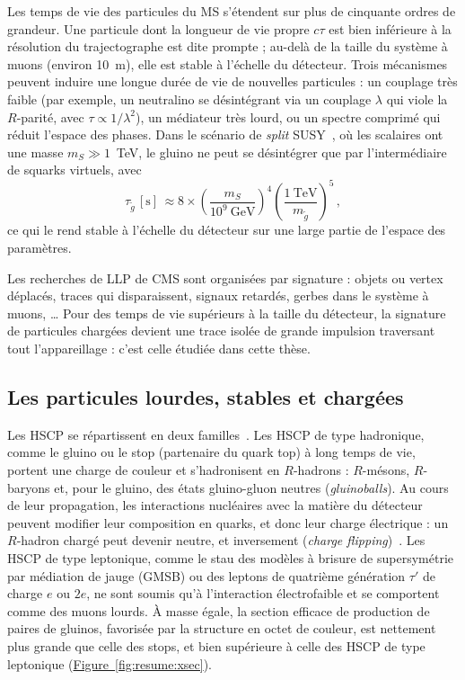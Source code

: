 Les temps de vie des particules du MS s'étendent sur plus de cinquante ordres de grandeur. Une particule dont la longueur de vie propre $c\tau$ est bien inférieure à la résolution du trajectographe est dite prompte ; au-delà de la taille du système à muons (environ 10~m), elle est stable à l'échelle du détecteur. Trois mécanismes peuvent induire une longue durée de vie de nouvelles particules : un couplage très faible (par exemple, un neutralino se désintégrant via un couplage $\lambda$ qui viole la $R$-parité, avec $\tau\propto1/\lambda^2$), un médiateur très lourd, ou un spectre comprimé qui réduit l'espace des phases. Dans le scénario de \textit{split} SUSY~\cite{ArkaniHamed:2004fb, Giudice:2004tc}, où les scalaires ont une masse $m_S\gg1$~TeV, le gluino ne peut se désintégrer que par l'intermédiaire de squarks virtuels, avec
\begin{equation}
    \tau_{\tilde{g}} \, [\mathrm{s}] \,\approx 8\times\left(\frac{m_S}{10^9~\mathrm{GeV}}\right)^4\left(\frac{1~\mathrm{TeV}}{m_{\tilde{g}}}\right)^5 \, ,
\end{equation}
ce qui le rend stable à l'échelle du détecteur sur une large partie de l'espace des paramètres.

Les recherches de LLP de CMS sont organisées par signature : objets ou vertex déplacés, traces qui disparaissent, signaux retardés, gerbes dans le système à muons, … Pour des temps de vie supérieurs à la taille du détecteur, la signature de particules chargées devient une trace isolée de grande impulsion traversant tout l'appareillage : c'est celle étudiée dans cette thèse.

\subsection{Les particules lourdes, stables et chargées}

Les HSCP se répartissent en deux familles~\cite{Fairbairn:2006gg}. Les HSCP de type hadronique, comme le gluino ou le stop (partenaire du quark top) à long temps de vie, portent une charge de couleur et s'hadronisent en $R$-hadrons : $R$-mésons, $R$-baryons et, pour le gluino, des états gluino-gluon neutres (\textit{gluinoballs}). Au cours de leur propagation, les interactions nucléaires avec la matière du détecteur peuvent modifier leur composition en quarks, et donc leur charge électrique : un $R$-hadron chargé peut devenir neutre, et inversement (\textit{charge flipping})~\cite{Mackeprang:2009ad}. Les HSCP de type leptonique, comme le stau des modèles à brisure de supersymétrie par médiation de jauge (GMSB) ou des leptons de quatrième génération $\tau'$ de charge $e$ ou $2e$, ne sont soumis qu'à l'interaction électrofaible et se comportent comme des muons lourds. À masse égale, la section efficace de production de paires de gluinos, favorisée par la structure en octet de couleur, est nettement plus grande que celle des stops, et bien supérieure à celle des HSCP de type leptonique (\hyperref[fig:resume:xsec]{Figure~\ref*{fig:resume:xsec}}).

